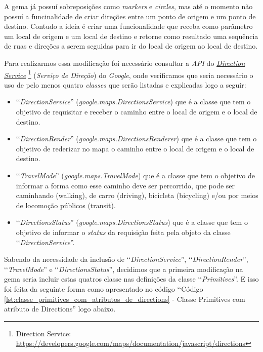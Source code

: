 A gema já possuí sobreposições como \emph{markers} e \emph{circles}, mas até o momento não possuí a 
funcinalidade de criar direções entre um ponto de origem e um ponto de destino. Contudo a ideia é criar 
uma funcionalidade que receba como parâmetro um local de origem e um local de destino e retorne como
resultado uma sequência de ruas e direções a serem seguidas para ir do local de origem ao local de destino.

Para realizarmos essa modificação foi necessário consultar a \emph{API} do 
\emph{\href{https://developers.google.com/maps/documentation/javascript/directions}{Direction Service}} 
\footnote{Direction Service: \url{https://developers.google.com/maps/documentation/javascript/directions}}
(\emph{Serviço de Direção}) do \emph{Google}, onde verificamos que seria necessário o uso de pelo menos
quatro \emph{classes} que serão listadas e explicadas logo a seguir:

\begin{itemize}

 \item ‘‘\emph{DirectionService}'' (\emph{google.maps.DirectionsService}) que é a classe que tem o 
 objetivo de requisitar e receber o caminho entre o local de origem e o local de destino.
 
 \item ‘‘\emph{DirectionRender}'' (\emph{google.maps.DirectionsRenderer}) que é a classe que tem o 
 objetivo de rederizar no mapa o caminho entre o local de origem e o local de destino.
 
 \item ‘‘\emph{TravelMode}'' (\emph{google.maps.TravelMode}) que é a classe que tem o objetivo de 
 informar a forma como esse caminho deve ser percorrido, que pode ser caminhando (walking), de carro 
 (driving), bicicleta (bicycling) e/ou por meios de locomoção públicos (transit).
 
 \item ‘‘\emph{DirectionsStatus}'' (\emph{google.maps.DirectionsStatus}) que é a classe que tem o
 objetivo de informar o \emph{status} da requisição feita pela objeto da classe
 ‘‘\emph{DirectionService}''.
 
\end{itemize}

Sabendo da necessidade da inclusão de ‘‘\emph{DirectionService}'', ‘‘\emph{DirectionRender}'',
‘‘\emph{TravelMode}'' e ‘‘\emph{DirectionsStatus}'', decidimos que a primeira modificação na gema seria 
incluir estas quatros classe nas definições da classe ‘‘\emph{Primitives}''. E isso foi 
feita da seguinte forma como apresentado no código ‘‘Código 
\ref{lst:classe_primitives_com_atributos_de_directions} - Classe Primitives com atributo de Directions'' 
logo abaixo.

